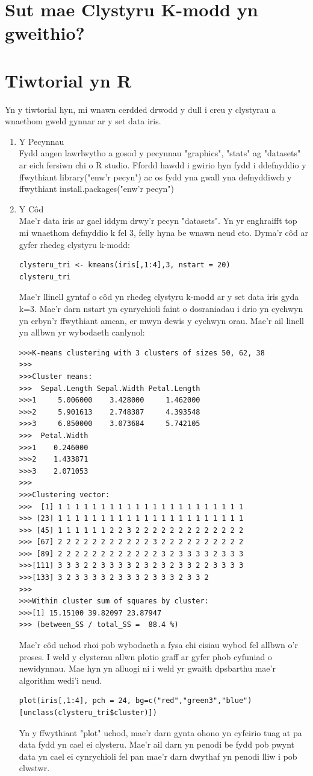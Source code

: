 \section{Sut mae Clystyru K-modd yn gweithio?}
\section{Tiwtorial yn R}
Yn y tiwtorial hyn, mi wnawn cerdded drwodd y dull i creu y clystyrau a wnaethom gweld gynnar ar y set data iris.
\begin{enumerate}
	\item Y Pecynnau \\
Fydd angen lawrlwytho a gosod y pecynnau "graphics", "stats" ag "datasets" ar eich fersiwn chi o R studio. Ffordd hawdd i gwirio hyn fydd i ddefnyddio y ffwythiant library("enw'r pecyn") ac os fydd yna gwall yna defnyddiwch y ffwythiant install.packages("enw'r pecyn")
	\item Y C\^{o}d \\
Mae'r data iris ar gael iddym drwy'r pecyn "datasets". Yn yr enghraifft top mi wnaethom defnyddio k fel 3, felly hyna be wnawn neud eto.
Dyma'r c\^{o}d ar gyfer rhedeg clystyru k-modd:
\begin{verbatim}
clysteru_tri <- kmeans(iris[,1:4],3, nstart = 20)
clysteru_tri 
\end{verbatim}
Mae'r llinell gyntaf o c\^{o}d yn rhedeg clystyru k-modd ar y set data iris gyda k=3. Mae'r darn nstart yn cynrychioli faint o dosraniadau i drio yn cychwyn yn erbyn'r ffwythiant amcan, er mwyn dewis y cychwyn orau. Mae'r ail linell yn allbwn yr wybodaeth canlynol:
\begin{verbatim}
>>>K-means clustering with 3 clusters of sizes 50, 62, 38
>>>
>>>Cluster means:
>>>  Sepal.Length Sepal.Width Petal.Length
>>>1     5.006000    3.428000     1.462000
>>>2     5.901613    2.748387     4.393548
>>>3     6.850000    3.073684     5.742105
>>>  Petal.Width
>>>1    0.246000
>>>2    1.433871
>>>3    2.071053
>>>
>>>Clustering vector:
>>>  [1] 1 1 1 1 1 1 1 1 1 1 1 1 1 1 1 1 1 1 1 1 1 1
>>> [23] 1 1 1 1 1 1 1 1 1 1 1 1 1 1 1 1 1 1 1 1 1 1
>>> [45] 1 1 1 1 1 1 2 2 3 2 2 2 2 2 2 2 2 2 2 2 2 2
>>> [67] 2 2 2 2 2 2 2 2 2 2 2 3 2 2 2 2 2 2 2 2 2 2
>>> [89] 2 2 2 2 2 2 2 2 2 2 2 2 3 2 3 3 3 3 2 3 3 3
>>>[111] 3 3 3 2 2 3 3 3 3 2 3 2 3 2 3 3 2 2 3 3 3 3
>>>[133] 3 2 3 3 3 3 2 3 3 3 2 3 3 3 2 3 3 2
>>>
>>>Within cluster sum of squares by cluster:
>>>[1] 15.15100 39.82097 23.87947
>>> (between_SS / total_SS =  88.4 %)
\end{verbatim}
Mae'r c\^{o}d uchod rhoi pob wybodaeth a fysa chi eisiau wybod fel allbwn o'r proses.
I weld y clysterau allwn plotio graff ar gyfer phob cyfuniad o newidynnau. Mae hyn yn alluogi ni i weld yr gwaith dpsbarthu mae'r algorithm wedi'i neud.
\begin{verbatim}
plot(iris[,1:4], pch = 24, bg=c("red","green3","blue")[unclass(clysteru_tri$cluster)])
\end{verbatim}
Yn y ffwythiant "plot" uchod, mae'r darn gynta ohono yn cyfeirio tuag at pa data fydd yn cael ei clysteru. Mae'r ail darn yn penodi be fydd pob pwynt data yn cael ei cynrychioli fel pan mae'r darn dwythaf yn penodi lliw i pob clwstwr.
\end{enumerate}
